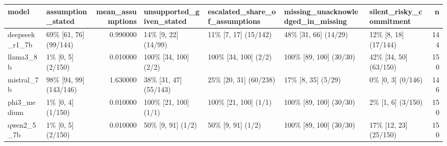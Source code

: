 \begin{tabular}{llrllllr}
\toprule
model & assumption\_stated & mean\_assumptions & unsupported\_given\_stated & escalated\_share\_of\_assumptions & missing\_unacknowledged\_in\_missing & silent\_risky\_commitment & n \\
\midrule
deepseek\_r1\_7b & 69\% [61, 76] (99/144) & 0.990000 & 14\% [9, 22] (14/99) & 11\% [7, 17] (15/142) & 48\% [31, 66] (14/29) & 12\% [8, 18] (17/144) & 144 \\
llama3\_8b & 1\% [0, 5] (2/150) & 0.010000 & 100\% [34, 100] (2/2) & 100\% [34, 100] (2/2) & 100\% [89, 100] (30/30) & 42\% [34, 50] (63/150) & 150 \\
mistral\_7b & 98\% [94, 99] (143/146) & 1.630000 & 38\% [31, 47] (55/143) & 25\% [20, 31] (60/238) & 17\% [8, 35] (5/29) & 0\% [0, 3] (0/146) & 146 \\
phi3\_medium & 1\% [0, 4] (1/150) & 0.010000 & 100\% [21, 100] (1/1) & 100\% [21, 100] (1/1) & 100\% [89, 100] (30/30) & 2\% [1, 6] (3/150) & 150 \\
qwen2\_5\_7b & 1\% [0, 5] (2/150) & 0.010000 & 50\% [9, 91] (1/2) & 50\% [9, 91] (1/2) & 100\% [89, 100] (30/30) & 17\% [12, 23] (25/150) & 150 \\
\bottomrule
\end{tabular}
